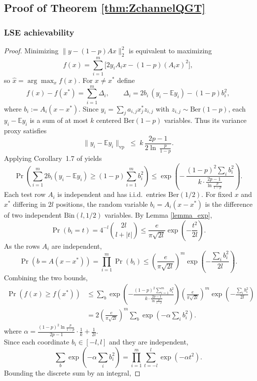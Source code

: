 \documentclass{article}
\newcommand{\E}{\mathbb{E}}
\newcommand{\Ber}{\mathrm{Ber}}
\begin{document}
\subsection{Proof of Theorem \ref{thm:ZchannelQGT}}
\subsubsection{LSE achievability}
\begin{proof}
Minimizing $\|y-(1-p)Ax\|_2^2$ is equivalent to maximizing
\[
f(x)=\sum_{i=1}^m \bigl[2y_i A_i x-(1-p)(A_i x)^2\bigr],
\]
so $\widehat{x}=\arg\max_x f(x)$.
For $x\neq x^*$ define
\[
f(x)-f(x^*)=\sum_{i=1}^m \Delta_i,
\qquad 
\Delta_i=2b_i\,(y_i-\E y_i)-(1-p)b_i^2,
\]
where $b_i:=A_i(x-x^*)$.  Since $y_i=\sum_j a_{i,j}x_j^*z_{i,j}$ with $z_{i,j}\sim\Ber(1-p)$,
each $y_i-\E y_i$ is a sum of at most $k$ centered $\Ber(1-p)$ variables.  
Thus its variance proxy satisfies
\[
\|y_i-\E y_i\|_{\mathrm{vp}}
\;\le\;
k\,\frac{2p-1}{2\ln\ \frac{p}{1-p}}.
\]
Applying Corollary~1.7 of \cite{rigollet_chapter_nodate} yields
\[
\Pr\!\left(\sum_{i=1}^m 2b_i(y_i-\E y_i)\ge (1-p)\sum_{i=1}^m b_i^2\right)
\le
\exp\!\left(-\,\frac{(1-p)^2\sum_i b_i^2}{k\cdot \frac{2p-1}{\ln\frac{p}{1-p}}}\right).
\]
Each test row $A_i$ is independent and has i.i.d.\ entries $\mathrm{Ber}(1/2)$.  
For fixed $x$ and $x^*$ differing in $2l$ positions, the random variable $b_i = A_i(x-x^*)$ is the difference of two independent $\mathrm{Bin}(l,1/2)$ variables.  
By Lemma \ref{lemma_exp},
\[
\Pr(b_i = t) = 4^{-l} {2l \choose l + |t|} \le \frac{e}{\pi\sqrt{2l}}\exp\!\left(-\frac{t^2}{2l}\right).
\]
As the rows $A_i$ are independent,
\[
\Pr(b = A(x-x^*)) = \prod_{i=1}^m \Pr(b_i)
\le \left(\frac{e}{\pi\sqrt{2l}}\right)^m
    \exp\!\left(-\frac{\sum_i b_i^2}{2l}\right).
\]
Combining the two bounds,
\begin{align*}
\Pr(f(x)\ge f(x^*))
&\le \sum_b \exp(-\frac{(1-p)^2\sum_{i=1}^m b_i^2}{k\cdot \frac{2p-1}{\ln\frac{p}{1-p}}})
        \left(\frac{e}{\pi\sqrt{2l}}\right)^m
        \exp\!\left(-\frac{\sum_i b_i^2}{2l}\right)\\
&= 2\left(\frac{e}{\pi\sqrt{2l}}\right)^m
    \sum_b \exp\!\left(-\alpha\sum_i b_i^2\right).
\end{align*}
where $\alpha = \frac{(1-p)^2\ln\frac{p}{1-p}}{2p-1}\cdot \frac{1}{k}+\frac{1}{2l}$.
\\
Since each coordinate $b_i\in[-l,l]$ and they are independent,
\[
\sum_b \exp\!\left(-\alpha\sum_i b_i^2\right)
= \prod_{i=1}^m \sum_{t=-l}^l \exp\!\left(-\alpha t^2\right).
\]
Bounding the discrete sum by an integral,

\end{proof}
\end{document}
